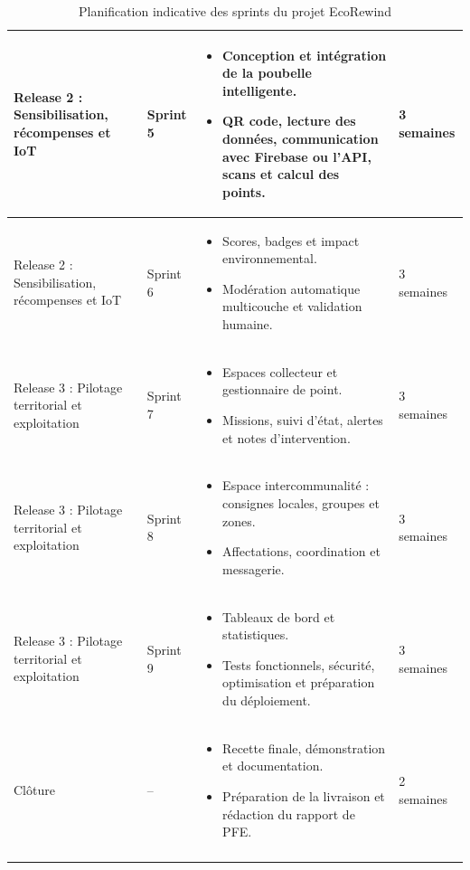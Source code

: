 \begin{longtable}{|p{2.7cm}|p{1.7cm}|p{8.1cm}|p{1.7cm}|}
\hline
Release 2 : Sensibilisation, récompenses et IoT & Sprint 5 & \begin{itemize}\item Conception et intégration de la poubelle intelligente.\item QR code, lecture des données, communication avec Firebase ou l'API, scans et calcul des points.\end{itemize} & 3 semaines \\
\hline
Release 2 : Sensibilisation, récompenses et IoT & Sprint 6 & \begin{itemize}\item Scores, badges et impact environnemental.\item Modération automatique multicouche et validation humaine.\end{itemize} & 3 semaines \\
\hline
Release 3 : Pilotage territorial et exploitation & Sprint 7 & \begin{itemize}\item Espaces collecteur et gestionnaire de point.\item Missions, suivi d'état, alertes et notes d'intervention.\end{itemize} & 3 semaines \\
\hline
Release 3 : Pilotage territorial et exploitation & Sprint 8 & \begin{itemize}\item Espace intercommunalité : consignes locales, groupes et zones.\item Affectations, coordination et messagerie.\end{itemize} & 3 semaines \\
\hline
Release 3 : Pilotage territorial et exploitation & Sprint 9 & \begin{itemize}\item Tableaux de bord et statistiques.\item Tests fonctionnels, sécurité, optimisation et préparation du déploiement.\end{itemize} & 3 semaines \\
\hline
Clôture & -- & \begin{itemize}\item Recette finale, démonstration et documentation.\item Préparation de la livraison et rédaction du rapport de PFE.\end{itemize} & 2 semaines \\
\hline
\caption{Planification indicative des sprints du projet EcoRewind}
\label{tab:planification_sprints_ecorewind}
\end{longtable}
\normalsize


